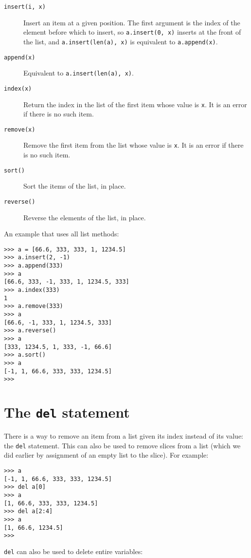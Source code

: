 \begin{description}

\item[{\tt insert(i, x)}]
Insert an item at a given position.  The first argument is the index of
the element before which to insert, so {\tt a.insert(0, x)} inserts at
the front of the list, and {\tt a.insert(len(a), x)} is equivalent to
{\tt a.append(x)}.

\item[{\tt append(x)}]
Equivalent to {\tt a.insert(len(a), x)}.

\item[{\tt index(x)}]
Return the index in the list of the first item whose value is {\tt x}.
It is an error if there is no such item.

\item[{\tt remove(x)}]
Remove the first item from the list whose value is {\tt x}.
It is an error if there is no such item.

\item[{\tt sort()}]
Sort the items of the list, in place.

\item[{\tt reverse()}]
Reverse the elements of the list, in place.

\end{description}

An example that uses all list methods:

\bcode\begin{verbatim}
>>> a = [66.6, 333, 333, 1, 1234.5]
>>> a.insert(2, -1)
>>> a.append(333)
>>> a
[66.6, 333, -1, 333, 1, 1234.5, 333]
>>> a.index(333)
1
>>> a.remove(333)
>>> a
[66.6, -1, 333, 1, 1234.5, 333]
>>> a.reverse()
>>> a
[333, 1234.5, 1, 333, -1, 66.6]
>>> a.sort()
>>> a
[-1, 1, 66.6, 333, 333, 1234.5]
>>>
\end{verbatim}\ecode

\section{The {\tt del} statement}

There is a way to remove an item from a list given its index instead
of its value: the {\tt del} statement.  This can also be used to
remove slices from a list (which we did earlier by assignment of an
empty list to the slice).  For example:

\bcode\begin{verbatim}
>>> a
[-1, 1, 66.6, 333, 333, 1234.5]
>>> del a[0]
>>> a
[1, 66.6, 333, 333, 1234.5]
>>> del a[2:4]
>>> a
[1, 66.6, 1234.5]
>>>
\end{verbatim}\ecode
%
{\tt del} can also be used to delete entire variables:

